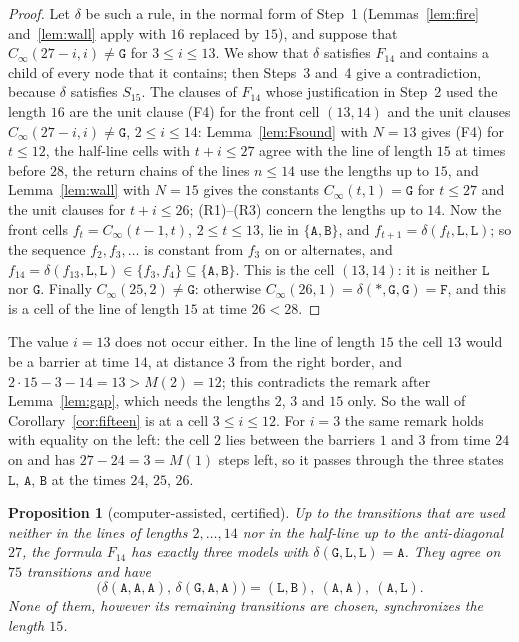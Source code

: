 \documentclass[11pt]{article}
\newtheorem{proposition}[lemma]{Proposition}
\theoremstyle{remark}
\newcommand{\Lq}{\mathtt{L}}\newcommand{\Gq}{\mathtt{G}}\newcommand{\Aq}{\mathtt{A}}\newcommand{\Bq}{\mathtt{B}}\newcommand{\Fq}{\mathtt{F}}
\begin{document}
\begin{proof}
Let $\delta$ be such a rule, in the normal form of Step~1 (Lemmas~\ref{lem:fire} and~\ref{lem:wall} apply with
$16$ replaced by $15$), and suppose that $C_\infty(27-i,i)\ne\Gq$ for $3\le i\le13$. We show that $\delta$
satisfies $F_{14}$ and contains a child of every node that it contains; then Steps~3 and~4 give a
contradiction, because $\delta$ satisfies $S_{15}$. The clauses of $F_{14}$ whose justification in Step~2 used
the length $16$ are the unit clause (F4) for the front cell $(13,14)$ and the unit clauses
$C_\infty(27-i,i)\ne\Gq$, $2\le i\le14$: Lemma~\ref{lem:Fsound} with $N=13$ gives (F4) for $t\le12$, the
half-line cells with $t+i\le27$ agree with the line of length $15$ at times before $28$, the return chains of
the lines $n\le14$ use the lengths up to $15$, and Lemma~\ref{lem:wall} with $N=15$ gives the constants
$C_\infty(t,1)=\Gq$ for $t\le27$ and the unit clauses for $t+i\le26$; (R1)--(R3) concern the lengths up to
$14$. Now the front cells $f_t=C_\infty(t-1,t)$, $2\le t\le13$, lie in $\{\Aq,\Bq\}$, and
$f_{t+1}=\delta(f_t,\Lq,\Lq)$; so the sequence $f_2,f_3,\dots$ is constant from $f_3$ on or alternates, and
$f_{14}=\delta(f_{13},\Lq,\Lq)\in\{f_3,f_4\}\subseteq\{\Aq,\Bq\}$. This is the cell $(13,14)$: it is neither
$\Lq$ nor $\Gq$. Finally $C_\infty(25,2)\ne\Gq$: otherwise $C_\infty(26,1)=\delta(\ast,\Gq,\Gq)=\Fq$, and this
is a cell of the line of length $15$ at time $26<28$.
\end{proof}

The value $i=13$ does not occur either. In the line of length $15$ the cell $13$ would be a barrier at time
$14$, at distance $3$ from the right border, and $2\cdot15-3-14=13>M(2)=12$; this contradicts the remark after
Lemma~\ref{lem:gap}, which needs the lengths $2$, $3$ and $15$ only. So the wall of
Corollary~\ref{cor:fifteen} is at a cell $3\le i\le12$. For $i=3$ the same remark holds with equality on the
left: the cell $2$ lies between the barriers $1$ and $3$ from time $24$ on and has $27-24=3=M(1)$ steps left,
so it passes through the three states $\Lq$, $\Aq$, $\Bq$ at the times $24$, $25$, $26$.

\begin{proposition}[computer-assisted, certified]\label{prop:three}
Up to the transitions that are used neither in the lines of lengths $2,\dots,14$ nor in the half-line up to
the anti-diagonal $27$, the formula $F_{14}$ has exactly three models with
$\delta(\Gq,\Lq,\Lq)=\Aq$. They agree on $75$ transitions and have
\[
\bigl(\delta(\Aq,\Aq,\Aq),\,\delta(\Gq,\Aq,\Aq)\bigr)=(\Lq,\Bq),\ (\Aq,\Aq),\ (\Aq,\Lq).
\]
None of them, however its remaining transitions are chosen, synchronizes the length $15$.
\end{proposition}
\end{document}
